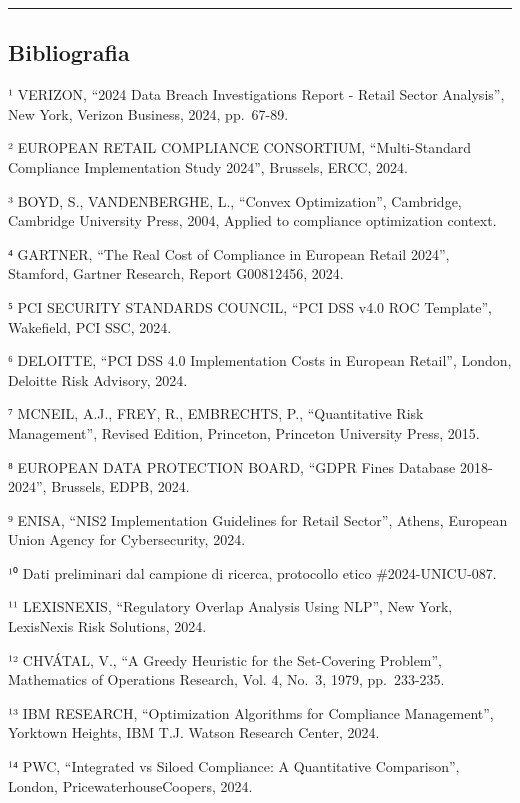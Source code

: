 \documentclass{report}
\begin{document}
\begin{center}\rule{0.5\linewidth}{0.5pt}\end{center}

\subsection{Bibliografia}\label{bibliografia-1}

¹ VERIZON, ``2024 Data Breach Investigations Report - Retail Sector
Analysis'', New York, Verizon Business, 2024, pp.~67-89.

² EUROPEAN RETAIL COMPLIANCE CONSORTIUM, ``Multi-Standard Compliance
Implementation Study 2024'', Brussels, ERCC, 2024.

³ BOYD, S., VANDENBERGHE, L., ``Convex Optimization'', Cambridge,
Cambridge University Press, 2004, Applied to compliance optimization
context.

⁴ GARTNER, ``The Real Cost of Compliance in European Retail 2024'',
Stamford, Gartner Research, Report G00812456, 2024.

⁵ PCI SECURITY STANDARDS COUNCIL, ``PCI DSS v4.0 ROC Template'',
Wakefield, PCI SSC, 2024.

⁶ DELOITTE, ``PCI DSS 4.0 Implementation Costs in European Retail'',
London, Deloitte Risk Advisory, 2024.

⁷ MCNEIL, A.J., FREY, R., EMBRECHTS, P., ``Quantitative Risk
Management'', Revised Edition, Princeton, Princeton University Press,
2015.

⁸ EUROPEAN DATA PROTECTION BOARD, ``GDPR Fines Database 2018-2024'',
Brussels, EDPB, 2024.

⁹ ENISA, ``NIS2 Implementation Guidelines for Retail Sector'', Athens,
European Union Agency for Cybersecurity, 2024.

¹⁰ Dati preliminari dal campione di ricerca, protocollo etico
\#2024-UNICU-087.

¹¹ LEXISNEXIS, ``Regulatory Overlap Analysis Using NLP'', New York,
LexisNexis Risk Solutions, 2024.

¹² CHVÁTAL, V., ``A Greedy Heuristic for the Set-Covering Problem'',
Mathematics of Operations Research, Vol. 4, No.~3, 1979, pp.~233-235.

¹³ IBM RESEARCH, ``Optimization Algorithms for Compliance Management'',
Yorktown Heights, IBM T.J. Watson Research Center, 2024.

¹⁴ PWC, ``Integrated vs Siloed Compliance: A Quantitative Comparison'',
London, PricewaterhouseCoopers, 2024.
\end{document}
